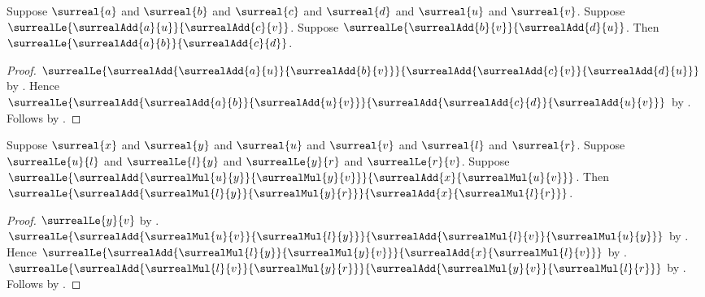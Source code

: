 \begin{lemma}\label{surreal_sqrt_add_cross_cancel_le}
    Suppose $\surreal{a}$ and $\surreal{b}$ and
        $\surreal{c}$ and $\surreal{d}$ and
        $\surreal{u}$ and $\surreal{v}$.
    Suppose $\surrealLe{\surrealAdd{a}{u}}{
        \surrealAdd{c}{v}}$.
    Suppose $\surrealLe{\surrealAdd{b}{v}}{
        \surrealAdd{d}{u}}$.
    Then $\surrealLe{\surrealAdd{a}{b}}{\surrealAdd{c}{d}}$.
\end{lemma}
\begin{proof}
    $\surrealLe{
        \surrealAdd{\surrealAdd{a}{u}}{\surrealAdd{b}{v}}}{
        \surrealAdd{\surrealAdd{c}{v}}{\surrealAdd{d}{u}}}$
        by .
    Hence $\surrealLe{
        \surrealAdd{\surrealAdd{a}{b}}{\surrealAdd{u}{v}}}{
        \surrealAdd{\surrealAdd{c}{d}}{\surrealAdd{u}{v}}}$
        by
        .
    Follows by
        .
\end{proof}

\begin{lemma}\label{surreal_sqrt_refine_mixed_interpolation}
    Suppose $\surreal{x}$ and $\surreal{y}$ and
        $\surreal{u}$ and $\surreal{v}$ and
        $\surreal{l}$ and $\surreal{r}$.
    Suppose $\surrealLe{u}{l}$ and $\surrealLe{l}{y}$ and
        $\surrealLe{y}{r}$ and $\surrealLe{r}{v}$.
    Suppose
        $\surrealLe{
            \surrealAdd{\surrealMul{u}{y}}{\surrealMul{y}{v}}}{
            \surrealAdd{x}{\surrealMul{u}{v}}}$.
    Then
        $\surrealLe{
            \surrealAdd{\surrealMul{l}{y}}{\surrealMul{y}{r}}}{
            \surrealAdd{x}{\surrealMul{l}{r}}}$.
\end{lemma}
\begin{proof}
    $\surrealLe{y}{v}$
        by .
    $\surrealLe{
        \surrealAdd{\surrealMul{u}{v}}{\surrealMul{l}{y}}}{
        \surrealAdd{\surrealMul{l}{v}}{\surrealMul{u}{y}}}$
        by .
    Hence
        $\surrealLe{
            \surrealAdd{\surrealMul{l}{y}}{\surrealMul{y}{v}}}{
            \surrealAdd{x}{\surrealMul{l}{v}}}$
        by .
    $\surrealLe{
        \surrealAdd{\surrealMul{l}{v}}{\surrealMul{y}{r}}}{
        \surrealAdd{\surrealMul{y}{v}}{\surrealMul{l}{r}}}$
        by .
    Follows by
        .
\end{proof}

